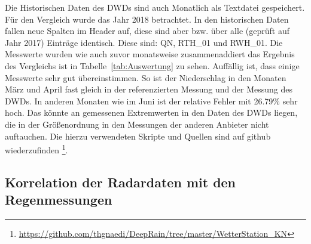 Die Historischen Daten des DWDs sind auch Monatlich als Textdatei gespeichert. Für den Vergleich wurde das Jahr 2018 betrachtet. In den historischen Daten fallen neue Spalten im Header auf, diese sind aber  bzw. über alle (geprüft auf Jahr 2017) Einträge identisch. Diese sind: QN, RTH\_01 und RWH\_01. Die Messwerte wurden wie auch zuvor monatsweise zusammenaddiert das Ergebnis des Vergleichs ist in Tabelle~\ref{tab:Auswertung} zu sehen. 
Auffällig ist, dass einige Messwerte sehr gut übereinstimmen. So ist der Niederschlag in den Monaten März und April fast gleich in der referenzierten Messung und der Messung des DWDs. In anderen Monaten wie im Juni ist der relative Fehler mit 26.79\% sehr hoch. Das könnte an gemessenen Extremwerten in den Daten des DWDs liegen, die in der Größenordnung in den Messungen der anderen Anbieter nicht auftauchen.
Die hierzu verwendeten Skripte und Quellen sind auf github wiederzufinden \footnote{\url{https://github.com/thgnaedi/DeepRain/tree/master/WetterStation_KN}}.  

\subsection{Korrelation der Radardaten mit den Regenmessungen}

